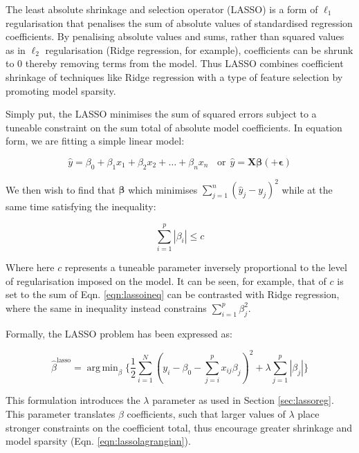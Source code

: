 \documentclass[a4paper,11pt,oneside]{book}
\DeclareMathOperator*{\argmin}{arg\,min}
\begin{document}
The least absolute shrinkage and selection operator (LASSO) is a form of $\ell_1$ regularisation that penalises the sum of absolute values of standardised regression coefficients. By penalising absolute values and sums, rather than squared values as in $\ell_2$ regularisation (Ridge regression, for example), coefficients can be shrunk to $0$ thereby removing terms from the model. Thus LASSO combines coefficient shrinkage of techniques like Ridge regression with a type of feature selection by promoting model sparsity.\cite{Tibshirani1994, Hastie2001}

Simply put, the LASSO minimises the sum of squared errors subject to a tuneable constraint on the sum total of absolute model coefficients. In equation form, we are fitting a simple linear model:

\begin{equation}
\hat{y} = \beta_0 + \beta_1 x_1 + \beta_2 x_2 + \ldots + \beta_n x_n
~~~~
\mathrm{or}~~\hat{y} = \bm{X}\bm{\beta} (+ \bm{\epsilon})
\end{equation} \vspace{.2em}

We then wish to find that $\bm{\beta}$ which minimises $\sum_{j=1}^{n}(\hat{y}_j - y_j)^2$ while at the same time satisfying the inequality:

\begin{equation}\label{eqn:lassoineq}
\sum\limits_{i=1}^{p} |\beta_i| \leq c
\end{equation} \vspace{.2em}

Where here $c$ represents a tuneable parameter inversely proportional to the level of regularisation imposed on the model. It can be seen, for example, that of $c$ is set to the sum of Eqn. \ref{eqn:lassoineq} can be contrasted with Ridge regression, where the same in inequality instead constrains $\sum_{i=1}^{p} \beta_j^2$.

Formally, the LASSO problem has been expressed as:\cite{Hastie2001}

\begin{equation}\label{eqn:lassolagrangian}
\hat{\beta}^\mathrm{lasso} = \argmin_\beta \bigg\{ 
\frac{1}{2} \sum_{i=1}^N (y_i - \beta_0 - \sum_{j=i}^p x_{ij}\beta_j)^2 
+ \lambda \sum_{j=1}^p |\beta_j|
\bigg\}
\end{equation} \vspace{.2em}

This formulation introduces the $\lambda$ parameter as used in Section \ref{sec:lassoreg}. This parameter translates $\beta$ coefficients, such that larger values of $\lambda$ place stronger constraints on the coefficient total, thus encourage greater shrinkage and model sparsity (Eqn. \ref{eqn:lassolagrangian}).
\end{document}
